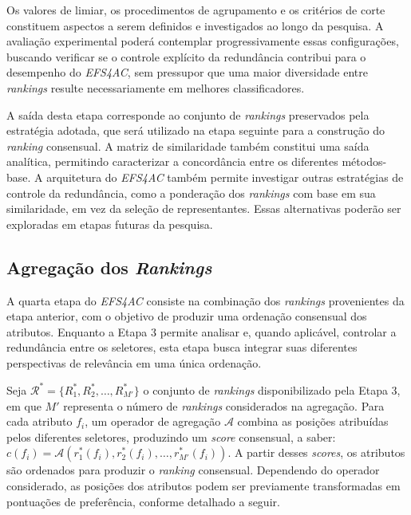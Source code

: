Os valores de limiar, os procedimentos de agrupamento e os critérios de corte constituem aspectos a serem definidos e investigados ao longo da pesquisa. A avaliação experimental poderá contemplar progressivamente essas configurações, buscando verificar se o controle explícito da redundância contribui para o desempenho do \textit{EFS4AC}, sem pressupor que uma maior diversidade entre \textit{rankings} resulte necessariamente em melhores classificadores.

A saída desta etapa corresponde ao conjunto de \textit{rankings} preservados pela estratégia adotada, que será utilizado na etapa seguinte para a construção do \textit{ranking} consensual. A matriz de similaridade também constitui uma saída analítica, permitindo caracterizar a concordância entre os diferentes métodos-base. A arquitetura do \textit{EFS4AC} também permite investigar outras estratégias de controle da redundância, como a ponderação dos \textit{rankings} com base em sua similaridade, em vez da seleção de representantes. Essas alternativas poderão ser exploradas em etapas futuras da pesquisa.

\subsection{Agregação dos \textit{Rankings}}
\label{sec:ac-efs-etapa4}

A quarta etapa do \textit{EFS4AC} consiste na combinação dos \textit{rankings} provenientes da etapa anterior, com o objetivo de produzir uma ordenação consensual dos atributos. Enquanto a Etapa 3 permite analisar e, quando aplicável, controlar a redundância entre os seletores, esta etapa busca integrar suas diferentes perspectivas de relevância em uma única ordenação.

Seja $\mathcal{R}^{*}=\{R_1^{*},R_2^{*},\ldots,R_{M'}^{*}\}$ o conjunto de \textit{rankings} disponibilizado pela Etapa 3, em que $M'$ representa o número de \textit{rankings} considerados na agregação. Para cada atributo $f_i$, um operador de agregação $\mathcal{A}$ combina as posições atribuídas pelos diferentes seletores, produzindo um \textit{score} consensual, a saber: $c(f_i)=\mathcal{A}\left(r_1^{*}(f_i),r_2^{*}(f_i),\ldots,r_{M'}^{*}(f_i)\right)$. A partir desses \textit{scores}, os atributos são ordenados para produzir o \textit{ranking} consensual. Dependendo do operador considerado, as posições dos atributos podem ser previamente transformadas em pontuações de preferência, conforme detalhado a seguir.

